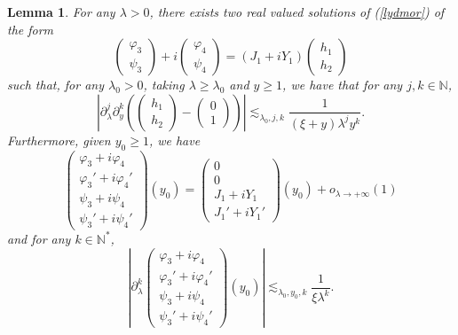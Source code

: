 \documentclass[11 pt]{amsart}
\newtheorem{lem}{Lemma}[section]
\theoremstyle{definition}
\theoremstyle{remark}
\numberwithin{equation}{section}
\begin{document}
\begin{lem}
  \label{diary}For any $\lambda > 0$, there exists two real valued solutions
  of (\ref{lydmor}) of the form
  \[ \left(\begin{array}{c}
       \varphi_3\\
       \psi_3
     \end{array}\right) + i \left(\begin{array}{c}
       \varphi_4\\
       \psi_4
     \end{array}\right) = (J_1 + i Y_1) \left(\begin{array}{c}
       h_1\\
       h_2
     \end{array}\right) \]
  such that, for any $\lambda_0 > 0$, taking $\lambda \geqslant \lambda_0$ and
  $y \geqslant 1$, we have that for any $j, k \in \mathbb{N}$,
  \[ \left| \partial_{\lambda}^j \partial_y^k \left( \left(\begin{array}{c}
       h_1\\
       h_2
     \end{array}\right) - \left(\begin{array}{c}
       0\\
       1
     \end{array}\right) \right) \right| \lesssim_{\lambda_0, j, k}
     \frac{1}{(\xi + y) \lambda^j y^k} . \]
  Furthermore, given $y_0 \geqslant 1$, we have
  \[ \left(\begin{array}{c}
       \varphi_3 + i \varphi_4\\
       \varphi_3' + i \varphi_4'\\
       \psi_3 + i \psi_4\\
       \psi_3' + i \psi_4'
     \end{array}\right) (y_0) = 
     \left(\begin{array}{c}
       0\\
       0\\
       J_1+i Y_1\\
       J_1'+i Y_1'
     \end{array}\right) (y_0) + o_{\lambda \rightarrow + \infty} (1) \]
  and for any $k \in \mathbb{N}^{\ast}$,
  \[ \left| \partial_{\lambda}^k \left(\begin{array}{c}
       \varphi_3 + i \varphi_4\\
       \varphi_3' + i \varphi_4'\\
       \psi_3 + i \psi_4\\
       \psi_3' + i \psi_4'
     \end{array}\right) (y_0) \right| \lesssim_{\lambda_0, y_0, k}
     \frac{1}{\xi \lambda^k} . \]
\end{lem}
\end{document}
